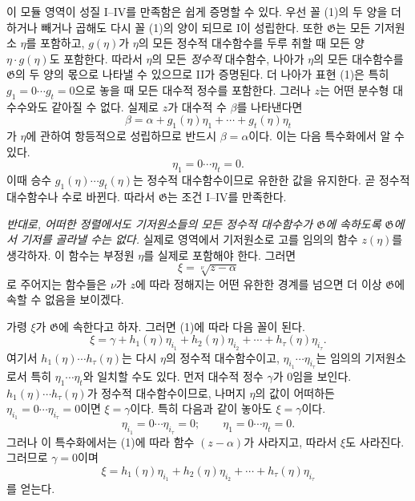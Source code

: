 이 모듈 영역이 성질 I--IV를 만족함은 쉽게 증명할 수 있다. 우선 꼴 (1)의 두 양을 더하거나 빼거나 곱해도 다시 꼴 (1)의 양이 되므로 I이 성립한다. 또한 $\mathfrak G$는 모든 기저원소 $\eta$를 포함하고, $g(\eta)$가 $\eta$의 모든 정수적 대수함수를 두루 취할 때 모든 양 $\eta\cdot g(\eta)$도 포함한다. 따라서 $\eta$의 모든 \emph{정수적} 대수함수, 나아가 $\eta$의 모든 대수함수를 $\mathfrak G$의 두 양의 몫으로 나타낼 수 있으므로 II가 증명된다. 더 나아가 표현 (1)은 특히 $g_1=0\cdots g_t=0$으로 놓을 때 모든 대수적 정수를 포함한다. 그러나 $z$는 어떤 분수형 대수수와도 같아질 수 없다. 실제로 $z$가 대수적 수 $\beta$를 나타낸다면
\[
 \beta=\alpha+g_1(\eta)\eta_1+\cdots+g_t(\eta)\eta_t
\]
가 $\eta$에 관하여 항등적으로 성립하므로 반드시 $\beta=\alpha$이다. 이는 다음 특수화에서 알 수 있다.
\[
 \eta_1=0\cdots \eta_t=0.
\]
이때 승수 $g_1(\eta)\cdots g_t(\eta)$는 정수적 대수함수이므로 유한한 값을 유지한다. 곧 정수적 대수함수나 수로 바뀐다. 따라서 $\mathfrak G$는 조건 I--IV를 만족한다.

\emph{반대로, 어떠한 정렬에서도 기저원소들의 모든 정수적 대수함수가 $\mathfrak G$에 속하도록 $\mathfrak G$에서 기저를 골라낼 수는 없다.} 실제로 영역에서 기저원소로 고를 임의의 함수 $z(\eta)$를 생각하자. 이 함수는 부정원 $\eta$를 실제로 포함해야 한다. 그러면
\[
 \xi=\sqrt[\nu]{z-\alpha}
\]
로 주어지는 함수들은 $\nu$가 $z$에 따라 정해지는 어떤 유한한 경계를 넘으면 더 이상 $\mathfrak G$에 속할 수 없음을 보이겠다.

가령 $\xi$가 $\mathfrak G$에 속한다고 하자. 그러면 (1)에 따라 다음 꼴이 된다.
\[
 \xi=\gamma+h_1(\eta)\eta_{i_1}+h_2(\eta)\eta_{i_2}
      +\cdots+h_\tau(\eta)\eta_{i_\tau}.
\]
여기서 $h_1(\eta)\cdots h_\tau(\eta)$는 다시 $\eta$의 정수적 대수함수이고, $\eta_{i_1}\cdots\eta_{i_\tau}$는 임의의 기저원소로서 특히 $\eta_1\cdots\eta_t$와 일치할 수도 있다. 먼저 대수적 정수 $\gamma$가 $0$임을 보인다. $h_1(\eta)\cdots h_\tau(\eta)$가 정수적 대수함수이므로, 나머지 $\eta$의 값이 어떠하든 $\eta_{i_1}=0\cdots\eta_{i_\tau}=0$이면 $\xi=\gamma$이다. 특히 다음과 같이 놓아도 $\xi=\gamma$이다.
\[
 \eta_{i_1}=0\cdots \eta_{i_\tau}=0; \qquad
 \eta_1=0\cdots \eta_t=0.
\]
그러나 이 특수화에서는 (1)에 따라 함수 $(z-\alpha)$가 사라지고, 따라서 $\xi$도 사라진다. 그러므로 $\gamma=0$이며
\[
 \xi=h_1(\eta)\eta_{i_1}+h_2(\eta)\eta_{i_2}
      +\cdots+h_\tau(\eta)\eta_{i_\tau}
\]
를 얻는다.


